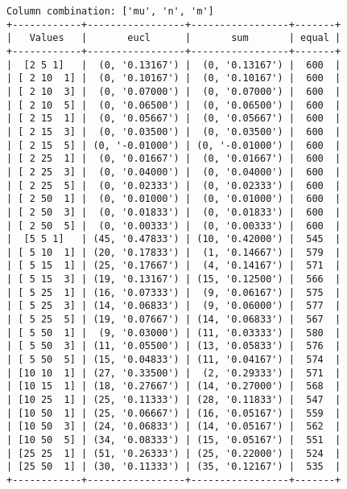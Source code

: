 \documentclass{article}
\begin{document}
\begin{verbatim}
Column combination: ['mu', 'n', 'm']
+------------+-----------------+-----------------+-------+
|   Values   |       eucl      |       sum       | equal |
+------------+-----------------+-----------------+-------+
|  [2 5 1]   |  (0, '0.13167') |  (0, '0.13167') |  600  |
| [ 2 10  1] |  (0, '0.10167') |  (0, '0.10167') |  600  |
| [ 2 10  3] |  (0, '0.07000') |  (0, '0.07000') |  600  |
| [ 2 10  5] |  (0, '0.06500') |  (0, '0.06500') |  600  |
| [ 2 15  1] |  (0, '0.05667') |  (0, '0.05667') |  600  |
| [ 2 15  3] |  (0, '0.03500') |  (0, '0.03500') |  600  |
| [ 2 15  5] | (0, '-0.01000') | (0, '-0.01000') |  600  |
| [ 2 25  1] |  (0, '0.01667') |  (0, '0.01667') |  600  |
| [ 2 25  3] |  (0, '0.04000') |  (0, '0.04000') |  600  |
| [ 2 25  5] |  (0, '0.02333') |  (0, '0.02333') |  600  |
| [ 2 50  1] |  (0, '0.01000') |  (0, '0.01000') |  600  |
| [ 2 50  3] |  (0, '0.01833') |  (0, '0.01833') |  600  |
| [ 2 50  5] |  (0, '0.00333') |  (0, '0.00333') |  600  |
|  [5 5 1]   | (45, '0.47833') | (10, '0.42000') |  545  |
| [ 5 10  1] | (20, '0.17833') |  (1, '0.14667') |  579  |
| [ 5 15  1] | (25, '0.17667') |  (4, '0.14167') |  571  |
| [ 5 15  3] | (19, '0.13167') | (15, '0.12500') |  566  |
| [ 5 25  1] | (16, '0.07333') |  (9, '0.06167') |  575  |
| [ 5 25  3] | (14, '0.06833') |  (9, '0.06000') |  577  |
| [ 5 25  5] | (19, '0.07667') | (14, '0.06833') |  567  |
| [ 5 50  1] |  (9, '0.03000') | (11, '0.03333') |  580  |
| [ 5 50  3] | (11, '0.05500') | (13, '0.05833') |  576  |
| [ 5 50  5] | (15, '0.04833') | (11, '0.04167') |  574  |
| [10 10  1] | (27, '0.33500') |  (2, '0.29333') |  571  |
| [10 15  1] | (18, '0.27667') | (14, '0.27000') |  568  |
| [10 25  1] | (25, '0.11333') | (28, '0.11833') |  547  |
| [10 50  1] | (25, '0.06667') | (16, '0.05167') |  559  |
| [10 50  3] | (24, '0.06833') | (14, '0.05167') |  562  |
| [10 50  5] | (34, '0.08333') | (15, '0.05167') |  551  |
| [25 25  1] | (51, '0.26333') | (25, '0.22000') |  524  |
| [25 50  1] | (30, '0.11333') | (35, '0.12167') |  535  |
+------------+-----------------+-----------------+-------+
\end{verbatim}
\end{document}
